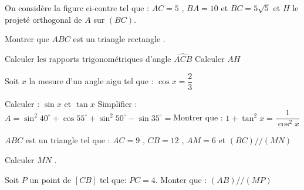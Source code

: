 \documentclass[a4paper,addpoints,12pt]{exam}
\begin{document}
\begin{exo}[7]
On considère la figure ci-contre tel que : $AC=5$ , $BA=10$ et $BC=5\sqrt{5}$ et $H$ le projeté orthogonal de $A$ sur $(BC)$.
\begin{questions}
\question[1] Montrer que $ABC$ est un triangle rectangle .\droppoints
\begin{minipage}{0.6\linewidth}
\anserline[5]
\end{minipage}%
\begin{minipage}{0.4\linewidth}
\end{minipage}
\question[2] Calculer les rapports trigonométriques d'angle $\widehat{ACB}$\droppoints
\anserline[3]
\question[1] Calculer $AH$\droppoints
\anserline[3]
\end{questions}
Soit $x$ la mesure d'un angle aigu tel que : $\cos x =\dfrac{2}{3}$
\begin{questions}
\setcounter{question}{3}
\question[1] Calculer : $\sin x$ et $\tan x$\droppoints
\anserline[4]
\question[1] Simplifier  :\droppoints
$A = \sin^{2}40^{\circ} +\cos55^{\circ} +\sin^{2}50^{\circ}-\sin35^{\circ} =$\anserline[3]
\question[1] Montrer que : $1+\tan^{2}x = \dfrac{1}{\cos^{2}x}$\droppoints
\anserline[4]
\end{questions}
\end{exo}

\begin{exo}[2]
$ABC$ est un triangle tel que : $AC=9$ , $CB=12$ , $AM=6$  et $(BC)//(MN)$
\begin{questions}
\question[1] Calculer  $MN$ .\droppoints
\begin{minipage}{0.6\linewidth}
\anserline[6]
\end{minipage}
\begin{minipage}{0.4\linewidth}
\end{minipage}
\anserline[3]
\question[1] Soit $P$ un point de $[CB] $ tel que: $PC=4$.
Monter que : $(AB)//(MP)$\droppoints
\anserline[8]
\end{questions}
\end{exo}
\end{document}
